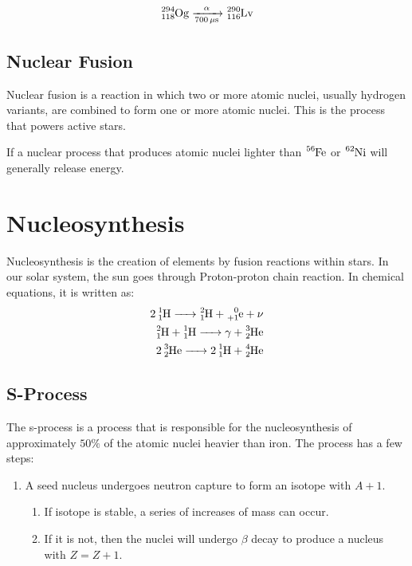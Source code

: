 \documentclass{article}
\begin{document}
\begin{multicols*}{2}
    \[
      \ce{^{294}_{118}Og ->[\alpha][700 \mu{s}] ^{290}_{116}Lv}
    \]
    \subsection{Nuclear Fusion}
    Nuclear fusion is a reaction in which two or more atomic nuclei, usually
    hydrogen variants, are combined to form one or more atomic nuclei. This
    is the process that powers active stars.

    If a nuclear process that produces atomic nuclei lighter than $\ce{^{56}Fe}$
    or $\ce{^{62}Ni}$ will generally release energy.

    \section{Nucleosynthesis}
    Nucleosynthesis is the creation of elements by fusion reactions within
    stars. In our solar system, the sun goes through Proton-proton chain reaction.
    In chemical equations, it is written as:
    \begin{equation*}
      \begin{split}
        \ce{2 ^{1}_{1}H -> ^{2}_{1}H + ^0_{+1}e + \nu}      \\
        \ce{^{2}_{1}H + ^{1}_{1}H -> \gamma{} + ^{3}_{2}He} \\
        \ce{2 ^{3}_{2}He -> 2 ^{1}_{1}H + ^{4}_{2}He}       \\
      \end{split}
    \end{equation*}

    \subsection{S-Process}
    The s-process is a process that is responsible for the nucleosynthesis
    of approximately $50\%$ of the atomic nuclei heavier than iron. The process
    has a few steps:
    \begin{enumerate}
      \item A seed nucleus undergoes neutron capture to form an isotope with $A+1$.
      \begin{enumerate}
        \item If isotope is stable, a series of increases of mass can occur.
        \item If it is not, then the nuclei will undergo $\beta$ decay to produce
        a nucleus with $Z=Z+1$.
      \end{enumerate}
    \end{enumerate}


\end{multicols*}
\end{document}
